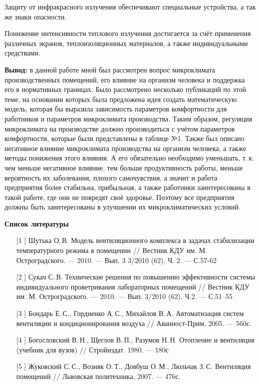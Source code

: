 \documentclass[a4paper,12pt,notitlepage,pdftex,headsepline]{scrartcl}
\begin{document}
  Защиту от инфракрасного излучения обеспечивают специальные устройства, а так
  же знаки опасности.

  Понижение интенсивности теплового излучения достигается за счёт применения
  различных экранов, теплоизоляционных материалов, а также индивидуальными
  средствами.

  \textbf{Вывод:} в данной работе мной был рассмотрен вопрос микроклимата
  производственных помещений, его влияние на организм человека и поддержка его
  в нормативных границах.
  Было рассмотрено несколько публикаций по этой теме, на основании которых
  была предложена идея создать математическую модель, которая бы выразила
  зависимость параметров комфортности для работников и параметров микроклимата
  производства.
  Таким образом, регуляция микроклимата на производстве должно производиться с
  учётом параметров комфортности, которые были представлены в таблице №1.
  Также был описано негативное влияние микроклимата производства на организм
  человека, а также методы понижения этого влияния.
  А его обязательно необходимо уменьшать, т.\,к. чем меньше негативное
  влияние, тем больше продуктивность работы, меньше вероятность их
  заболевания, плохого самочувствия, а значит и работа предприятия более
  стабильна, прибыльная, а также работники заинтересованы в такой работе, где
  они не повредят своё здоровье.
  Поэтому все предприятия должны быть заинтересованы в улучшении их
  микроклиматических условий.


  \newpage
  \begin{center}
    \large
    \bf
    Список литературы
  \end{center}
  \begin{itemize}
    \item[[1]] Шутька О.\,В. Модель вентиляционного комплекса в задачах
      стабилизации температурного режима в помещении // Вестник КДУ им. М.
      Остроградского. --- 2010. --- Вып. 3 3/2010 (62). Ч. 2. --- С.57-62
    \item[[2]] Сукач С.\,В. Технические решения по повышению эффективности системы
      индивидуального проветривания лабораторных помещений // Вестник КДУ им.
      М. Остроградского. --- 2010. --- Вып. 3/2010 (62). Ч.2. --- С.51--55
    \item[[3]] Бондарь Е.\,С., Гордиенко А.\,С., Михайлов В.\,А. Автоматизация
      систем вентиляции и кондиционирования воздуха // Аванност-Прим, 2005.
      --- 560с.
    \item[[4]] Богословский В.\,Н., Щеглов В.\,П., Разумов Н.\,Н. Отопление и
      вентиляция (учебник для вузов) // Стройиздат. 1980. --- 180с
    \item[[5]] Жуковский С.\,С., Возняк О.\,Т., Довбуш О.\,М., Люльчак З.\,С.
      Вентиляция помещений // Львовская политехника, 2007. --- 476с.
  \end{itemize}
\end{document}
